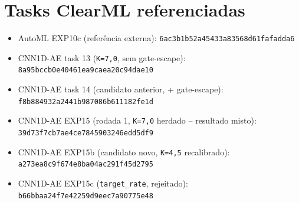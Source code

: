 \documentclass[11pt,a4paper]{article}
\begin{document}
\appendix
\section{Tasks ClearML referenciadas}

\begin{itemize}[leftmargin=1.4em]
\small
  \item AutoML EXP10c (referência externa): \texttt{6ac3b1b52a45433a83568d61fafadda6}
  \item CNN1D-AE task 13 (\texttt{K=7,0}, sem gate-escape): \texttt{8a95bccb0e40461ea9caea20c94dae10}
  \item CNN1D-AE task 14 (candidato anterior, + gate-escape): \texttt{f8b884932a2441b987086b611182fe1d}
  \item CNN1D-AE EXP15 (rodada 1, \texttt{K=7,0} herdado -- resultado misto): \texttt{39d73f7cb7ae4ce7845903246edd5df9}
  \item CNN1D-AE EXP15b (candidato novo, \texttt{K=4,5} recalibrado): \texttt{a273ea8c9f674e8ba04ac291f45d2795}
  \item CNN1D-AE EXP15c (\texttt{target\_rate}, rejeitado): \texttt{b66bbaa24f7e42259d9eec7a90775e48}
\end{itemize}
\end{document}
